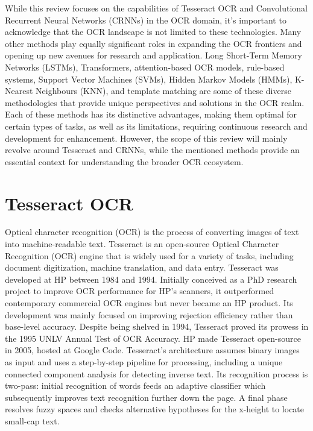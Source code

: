 While this review focuses on the capabilities of Tesseract OCR and Convolutional Recurrent Neural Networks (CRNNs) in the OCR domain, it's important to acknowledge that the OCR landscape is not limited to these technologies. Many other methods play equally significant roles in expanding the OCR frontiers and opening up new avenues for research and application. Long Short-Term Memory Networks (LSTMs), Transformers, attention-based OCR models, rule-based systems, Support Vector Machines (SVMs), Hidden Markov Models (HMMs), K-Nearest Neighbours (KNN), and template matching are some of these diverse methodologies that provide unique perspectives and solutions in the OCR realm. Each of these methods has its distinctive advantages, making them optimal for certain types of tasks, as well as its limitations, requiring continuous research and development for enhancement. However, the scope of this review will mainly revolve around Tesseract and CRNNs, while the mentioned methods provide an essential context for understanding the broader OCR ecosystem.

\newpage

\section{Tesseract OCR}

Optical character recognition (OCR) is the process of converting images of text into machine-readable text. Tesseract is an open-source Optical Character Recognition (OCR) engine that is widely used for a variety of tasks, including document digitization, machine translation, and data entry. Tesseract was developed at HP between 1984 and 1994. Initially conceived as a PhD research project to improve OCR performance for HP's scanners, it outperformed contemporary commercial OCR engines but never became an HP product. Its development was mainly focused on improving rejection efficiency rather than base-level accuracy. Despite being shelved in 1994, Tesseract proved its prowess in the 1995 UNLV Annual Test of OCR Accuracy. HP made Tesseract open-source in 2005, hosted at Google Code. Tesseract's architecture assumes binary images as input and uses a step-by-step pipeline for processing, including a unique connected component analysis for detecting inverse text. Its recognition process is two-pass: initial recognition of words feeds an adaptive classifier which subsequently improves text recognition further down the page. A final phase resolves fuzzy spaces and checks alternative hypotheses for the x-height to locate small-cap text. \cite{smithOverviewTesseractOCR2007}



